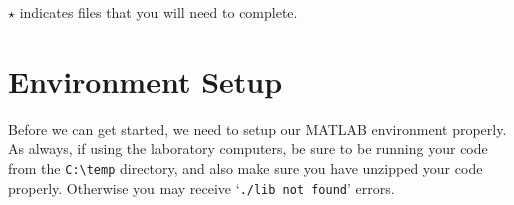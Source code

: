 \documentclass[11pt, letterpaper]{article}
\begin{document}
\noindent
$\star$ indicates files that you will need to complete.


\setcounter{section}{-1}
\section{Environment Setup}
Before we can get started, we need to setup our MATLAB environment properly. As always, if using the laboratory computers, be sure to be running your code from the \texttt{C:\textbackslash temp} directory, and also make sure you have unzipped your code properly. Otherwise you may receive `\texttt{./lib not found}' errors.
\end{document}
